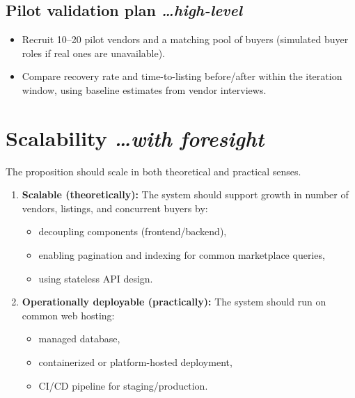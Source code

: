 \documentclass[11pt,a4paper]{article}
\newcommand{\BvrHint}[1]{%
  {\normalfont\normalsize\itshape\hfill #1}}
\begin{document}
\subsection{Pilot validation plan %
\BvrHint{\ldots high-level}}
\begin{itemize}[leftmargin=0.7cm]
    \item Recruit 10--20 pilot vendors and a matching pool of buyers (simulated buyer roles if real ones are unavailable).
    \item Compare recovery rate and time-to-listing before/after within the iteration window, using baseline estimates from vendor interviews.
\end{itemize}

\section{Scalability %
\BvrHint{\ldots with foresight}}
The proposition should scale in both theoretical and
practical senses.

\begin{enumerate}[leftmargin=0.7cm]
    \item \textbf{Scalable (theoretically):} The system should support growth in number of vendors, listings, and concurrent buyers by:
    \begin{itemize}[leftmargin=0.7cm]
        \item decoupling components (frontend/backend),
        \item enabling pagination and indexing for common marketplace queries,
        \item using stateless API design.
    \end{itemize}

    \item \textbf{Operationally deployable (practically):} The system should run on common web hosting:
    \begin{itemize}[leftmargin=0.7cm]
        \item managed database,
        \item containerized or platform-hosted deployment,
        \item CI/CD pipeline for staging/production.
    \end{itemize}
\end{enumerate}
\end{document}
